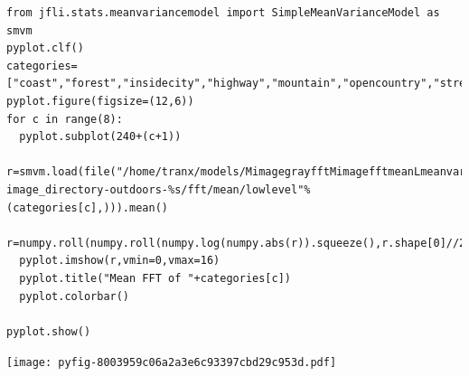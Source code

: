\documentclass{report}
\begin{document}
\begin{lstlisting}
from jfli.stats.meanvariancemodel import SimpleMeanVarianceModel as smvm
pyplot.clf()
categories=["coast","forest","insidecity","highway","mountain","opencountry","street","tallbuilding"]
pyplot.figure(figsize=(12,6))
for c in range(8):
  pyplot.subplot(240+(c+1))
  r=smvm.load(file("/home/tranx/models/MimagegrayfftMimagefftmeanLmeanvariancemodelSimpleMeanVarianceModel-image_directory-outdoors-%s/fft/mean/lowlevel"%(categories[c],))).mean()
  r=numpy.roll(numpy.roll(numpy.log(numpy.abs(r)).squeeze(),r.shape[0]//2,axis=0),r.shape[0]//2,axis=1)
  pyplot.imshow(r,vmin=0,vmax=16)
  pyplot.title("Mean FFT of "+categories[c])
  pyplot.colorbar()

pyplot.show()

\end{lstlisting}















\noindent
\texttt{[image: pyfig-8003959c06a2a3e6c93397cbd29c953d.pdf]}
\end{document}

